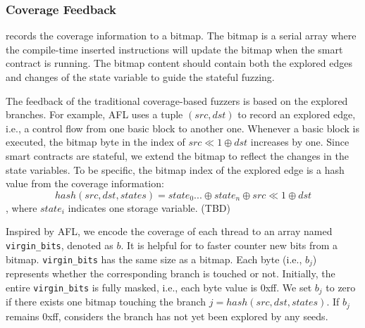 \subsubsection{Coverage Feedback}
\label{sec:runner:coverage}
{\runner} records the coverage information to a bitmap.
The bitmap is a serial array where the compile-time inserted instructions will update the bitmap when the smart contract is running. 
%
The bitmap content should contain both the explored edges and changes of the state variable to guide the stateful fuzzing.


The feedback of the traditional coverage-based fuzzers is based on the explored branches.
For example, AFL uses a tuple $(src, dst)$ to record an explored edge, i.e., a control flow from one basic block to another one. Whenever a basic block is executed, the bitmap byte in the index of $src \ll 1 \oplus dst$ increases by one. 
Since smart contracts are stateful, we extend the bitmap to reflect the changes in the state variables. 
To be specific, the bitmap index of the explored edge is a hash value from the coverage information: 
$$
hash(src,dst,states) = state_0 ... \oplus state_n \oplus src \ll 1 \oplus dst
$$ , where $state_i$ indicates one storage variable. (TBD)


Inspired by AFL\cite{afl}, we encode the coverage of each thread to an array named
\texttt{virgin\_bits}\cite{afl}, denoted as $b$. 
It is helpful for {\runner} to faster counter new bits from a bitmap.
\texttt{virgin\_bits} has the same size as a bitmap.
Each byte (i.e., $b_j$) represents whether the corresponding branch is touched or not.
Initially, the entire \texttt{virgin\_bits} is fully masked, i.e., each byte value is 0xff.
We set $b_j$ to zero if there exists one bitmap touching the branch $j = hash(src,dst,states)$. 
If $b_j$ remains 0xff, {\runner} considers the branch has not yet been explored by any seeds. 

